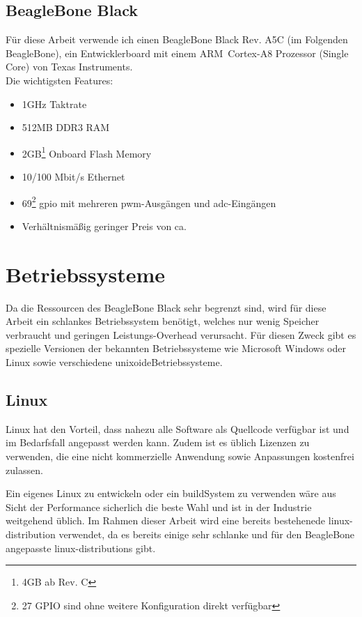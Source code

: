\documentclass[thesis.tex]{subfiles}
\begin{document}
\subsection{BeagleBone Black}
Für diese Arbeit verwende ich einen BeagleBone Black Rev. A5C (im Folgenden BeagleBone), ein Entwicklerboard mit einem ARM\textregistered ~Cortex\texttrademark -A8 Prozessor (Single Core) von Texas Instruments.\\

\noindent Die wichtigsten Features:
\begin{itemize}
\item 1GHz Taktrate
\item 512MB DDR3 RAM
\item 2GB\footnote{4GB ab Rev. C} Onboard Flash Memory
\item 10/100 Mbit/s Ethernet
\item 69\footnote{27 GPIO sind ohne weitere Konfiguration direkt verfügbar} \gls{gpio} mit mehreren \gls{pwm}-Ausgängen und \gls{adc}-Eingängen
\item Verhältnismäßig geringer Preis von ca. 
\end{itemize}


\section{Betriebssysteme}
Da die Ressourcen des BeagleBone Black sehr begrenzt sind, wird für diese Arbeit ein schlankes Betriebssystem benötigt, welches nur wenig Speicher verbraucht und geringen Leistungs-Overhead verursacht. Für diesen Zweck gibt es spezielle Versionen der bekannten Betriebssysteme wie Microsoft Windows oder Linux sowie verschiedene \gls{unixoideBetriebssysteme}.


\subsection{Linux}
Linux hat den Vorteil, dass nahezu alle Software als Quellcode verfügbar ist und im Bedarfsfall angepasst werden kann. Zudem ist es üblich Lizenzen zu verwenden, die eine nicht kommerzielle Anwendung sowie Anpassungen kostenfrei zulassen.

Ein eigenes Linux zu entwickeln oder ein \gls{buildSystem} zu verwenden wäre aus Sicht der Performance sicherlich die beste Wahl und ist in der Industrie weitgehend üblich. Im Rahmen dieser Arbeit wird eine bereits bestehenede \gls{linux-distribution} verwendet, da es bereits einige sehr schlanke und für den BeagleBone angepasste \glspl{linux-distribution} gibt.
\end{document}
